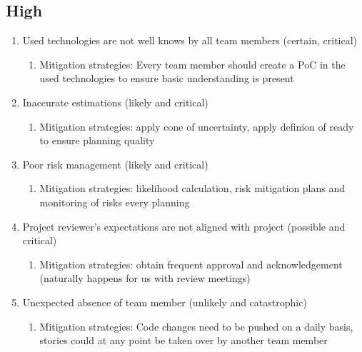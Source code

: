 \subsection{High}
\begin{enumerate}
    \item Used technologies are not well knows by all team members (certain, critical) 
    \begin{enumerate}
        \item Mitigation strategies: Every team member should create a PoC in the used technologies to ensure basic understanding is present 
    \end{enumerate}

    \item Inaccurate estimations (likely and critical) 
    \begin{enumerate}
        \item Mitigation strategies: apply cone of uncertainty, apply definion of ready to ensure planning quality 
    \end{enumerate}

    \item Poor risk management (likely and critical)  
    \begin{enumerate}
        \item Mitigation strategies: likelihood calculation, risk mitigation plans and monitoring of risks every planning 
    \end{enumerate}

    \item Project reviewer's expectations are not aligned with project (possible and critical) 
    \begin{enumerate}
        \item Mitigation strategies: obtain frequent approval and acknowledgement (naturally happens for us with review meetings) 
    \end{enumerate}

    \item Unexpected absence of team member (unlikely and catastrophic) 
    \begin{enumerate}
        \item Mitigation strategies: Code changes need to be pushed on a daily basis, stories could at any point be taken over by another team member 
    \end{enumerate}
\end{enumerate}

